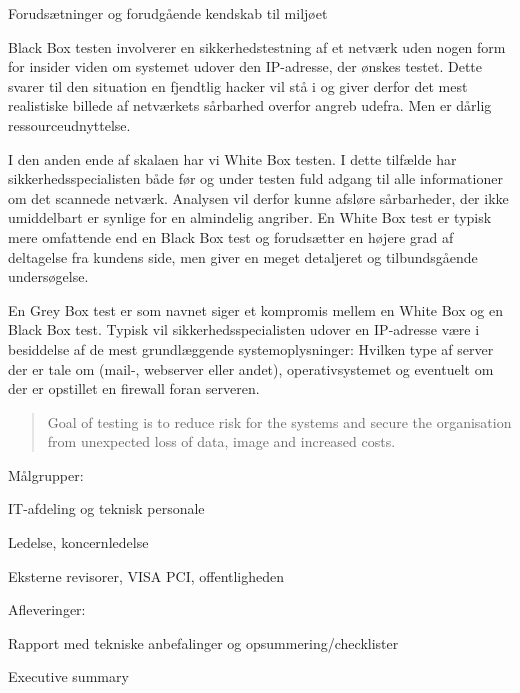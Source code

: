 \documentclass[Screen16to9,17pt]{foils}
\begin{document}
\begin{list2}
\item Forudsætninger og forudgående kendskab til miljøet
\item Black Box testen involverer en sikkerhedstestning af et netværk uden
nogen form for insider viden om systemet udover den IP-adresse, der
ønskes testet. Dette svarer til den situation en fjendtlig hacker vil
stå i og giver derfor det mest realistiske billede af netværkets
sårbarhed overfor angreb udefra. Men er dårlig ressourceudnyttelse.
\item I den anden ende  af skalaen har vi White Box testen. I dette tilfælde
har sikkerhedsspecialisten både før og under testen fuld adgang til
alle informationer om det scannede netværk. Analysen vil derfor kunne
afsløre sårbarheder, der ikke umiddelbart er synlige for en almindelig
angriber. En White Box test er typisk mere omfattende end en Black Box
test og forudsætter en højere grad af deltagelse fra kundens side, men
giver en meget detaljeret og tilbundsgående undersøgelse.

\item En Grey Box test er som navnet siger et kompromis mellem en White Box
og en Black Box test. Typisk vil sikkerhedsspecialisten udover en
IP-adresse være i besiddelse af de mest grundlæggende
systemoplysninger: Hvilken type af server der er tale om (mail-,
webserver eller andet), operativsystemet og eventuelt om der er
opstillet en firewall foran serveren.
\end{list2}



\begin{quote}
Goal of testing is to reduce risk for the systems and secure the organisation\\ from unexpected loss of data, image and increased costs.
\end{quote}

\begin{list1}
\item Målgrupper:
\begin{list2}
\item IT-afdeling og teknisk personale
\item Ledelse, koncernledelse
\item Eksterne revisorer, VISA PCI, offentligheden
\end{list2}
\item Afleveringer:
\begin{list2}
\item Rapport med tekniske anbefalinger og opsummering/checklister
\item Executive summary
\end{list2}
\end{list1}
\end{document}
